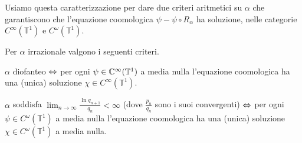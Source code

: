 Usiamo questa caratterizzazione per dare due criteri aritmetici su $\alpha$ che garantiscono
che l'equazione coomologica $\psi-\psi\circ R_\alpha$ ha soluzione,
nelle categorie $C^\infty(\mathbb{T}^1)$ e $C^\omega(\mathbb{T}^1)$.

\begin{teo}Per $\alpha$ irrazionale valgono i seguenti criteri.
\begin{lista}
\item $\alpha$ diofanteo $\Leftrightarrow$ per ogni $\psi\in\mathbb{C}^\infty(\mathbb{T}^1)$ a media nulla
l'equazione coomologica ha una (unica) soluzione $\chi\in C^\infty(\mathbb{T}^1)$.
\item $\alpha$ soddisfa $\lim_{n\to\infty}\frac{\ln q_{n+1}}{q_n}<\infty$ (dove $\frac{p_n}{q_n}$ sono i suoi convergenti)
$\Leftrightarrow$ per ogni $\psi\in C^\omega(\mathbb{T}^1)$ a media nulla
l'equazione coomologica ha una (unica) soluzione $\chi\in C^\omega(\mathbb{T}^1)$ a media nulla.
\end{lista}
\end{teo}

